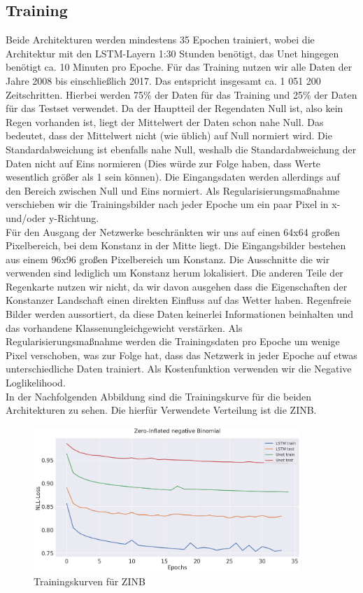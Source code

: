 \subsection{Training} \label{sec:Training}
Beide Architekturen werden mindestens 35 Epochen trainiert, wobei die Architektur mit den LSTM-Layern 1:30 Stunden benötigt, das Unet hingegen benötigt ca. 10 Minuten pro Epoche.
Für das Training nutzen wir alle Daten der Jahre 2008 bis einschließlich 2017. Das entspricht insgesamt ca. 1 051 200 Zeitschritten. Hierbei werden 75\% der Daten für das Training und 25\% der Daten für das Testset verwendet.
Da der Hauptteil der Regendaten Null ist, also kein Regen vorhanden ist, liegt der Mittelwert der Daten schon nahe Null. Das bedeutet, dass der Mittelwert nicht (wie üblich) auf Null normiert wird.
Die Standardabweichung ist ebenfalls nahe Null, weshalb die Standardabweichung der Daten nicht auf Eins normieren (Dies würde zur Folge haben, dass Werte wesentlich größer als 1 sein können). 
Die Eingangsdaten werden allerdings auf den Bereich zwischen Null und Eins normiert. Als Regularisierungsmaßnahme verschieben wir die Trainingsbilder nach jeder Epoche um ein paar Pixel in x- und/oder y-Richtung.\\

\noindent Für den Ausgang der Netzwerke beschränkten wir uns auf einen 64x64 großen Pixelbereich, bei dem Konstanz in der Mitte liegt. Die Eingangsbilder bestehen aus einem 96x96 großen Pixelbereich um Konstanz. Die Ausschnitte die wir verwenden sind lediglich um Konstanz herum lokalisiert. Die anderen Teile der Regenkarte nutzen wir nicht, da wir davon ausgehen dass die Eigenschaften der Konstanzer Landschaft einen direkten Einfluss auf das Wetter haben. Regenfreie Bilder werden aussortiert, da diese Daten keinerlei Informationen beinhalten und das vorhandene Klassenungleichgewicht verstärken. Als Regularisierungsmaßnahme werden die Trainingsdaten pro Epoche um wenige Pixel verschoben, was zur Folge hat, dass das Netzwerk in jeder Epoche auf etwas unterschiedliche Daten trainiert. Als Kostenfunktion verwenden wir die Negative Loglikelihood.
\\

\noindent In der Nachfolgenden Abbildung sind die Trainingskurve für die beiden Architekturen zu sehen. Die hierfür Verwendete Verteilung ist die ZINB.

\begin{figure}[htb]
 \centering
 \includegraphics[width=0.9\textwidth,angle=0]{abb/Loss_zinfBinom.png}
 \caption{Trainingskurven für ZINB}
\label{fig:Inception-Conv-LSTM}
\end{figure}

